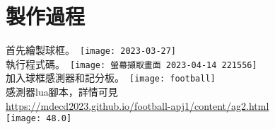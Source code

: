 \newpage
\section{製作過程}
首先繪製球框。\
\texttt{[image: 2023-03-27]}\\

執行程式碼。\
\texttt{[image: 螢幕擷取畫面 2023-04-14 221556]}\\
 
加入球框感測器和記分板。\
\texttt{[image: football]}\\

感測器lua腳本，詳情可見\\
\href{https://mdecd2023.github.io/football-apj1/content/ag2.html}{https://mdecd2023.github.io/football-apj1/content/ag2.html}\\
\texttt{[image: 48.0]}
